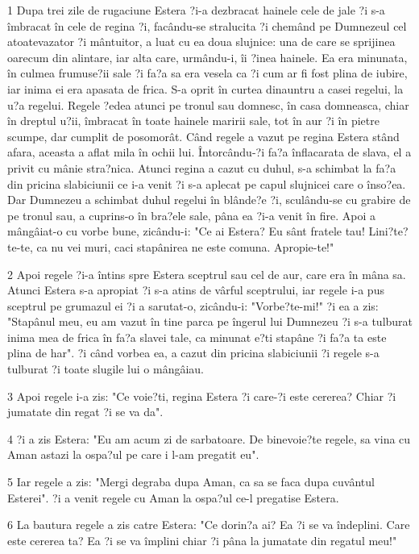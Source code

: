 \par 1 Dupa trei zile de rugaciune Estera ?i-a dezbracat hainele cele de jale ?i s-a îmbracat în cele de regina ?i, facându-se stralucita ?i chemând pe Dumnezeul cel atoatevazator ?i mântuitor, a luat cu ea doua slujnice: una de care se sprijinea oarecum din alintare, iar alta care, urmându-i, îi ?inea hainele. Ea era minunata, în culmea frumuse?ii sale ?i fa?a sa era vesela ca ?i cum ar fi fost plina de iubire, iar inima ei era apasata de frica. S-a oprit în curtea dinauntru a casei regelui, la u?a regelui. Regele ?edea atunci pe tronul sau domnesc, în casa domneasca, chiar în dreptul u?ii, îmbracat în toate hainele maririi sale, tot în aur ?i în pietre scumpe, dar cumplit de posomorât. Când regele a vazut pe regina Estera stând afara, aceasta a aflat mila în ochii lui. Întorcându-?i fa?a înflacarata de slava, el a privit cu mânie stra?nica. Atunci regina a cazut cu duhul, s-a schimbat la fa?a din pricina slabiciunii ce i-a venit ?i s-a aplecat pe capul slujnicei care o înso?ea. Dar Dumnezeu a schimbat duhul regelui în blânde?e ?i, sculându-se cu grabire de pe tronul sau, a cuprins-o în bra?ele sale, pâna ea ?i-a venit în fire. Apoi a mângâiat-o cu vorbe bune, zicându-i: "Ce ai Estera? Eu sânt fratele tau! Lini?te?te-te, ca nu vei muri, caci stapânirea ne este comuna. Apropie-te!"
\par 2 Apoi regele ?i-a întins spre Estera sceptrul sau cel de aur, care era în mâna sa. Atunci Estera s-a apropiat ?i s-a atins de vârful sceptrului, iar regele i-a pus sceptrul pe grumazul ei ?i a sarutat-o, zicându-i: "Vorbe?te-mi!" ?i ea a zis: "Stapânul meu, eu am vazut în tine parca pe îngerul lui Dumnezeu ?i s-a tulburat inima mea de frica în fa?a slavei tale, ca minunat e?ti stapâne ?i fa?a ta este plina de har". ?i când vorbea ea, a cazut din pricina slabiciunii ?i regele s-a tulburat ?i toate slugile lui o mângâiau.
\par 3 Apoi regele i-a zis: "Ce voie?ti, regina Estera ?i care-?i este cererea? Chiar ?i jumatate din regat ?i se va da".
\par 4 ?i a zis Estera: "Eu am acum zi de sarbatoare. De binevoie?te regele, sa vina cu Aman astazi la ospa?ul pe care i l-am pregatit eu".
\par 5 Iar regele a zis: "Mergi degraba dupa Aman, ca sa se faca dupa cuvântul Esterei". ?i a venit regele cu Aman la ospa?ul ce-l pregatise Estera.
\par 6 La bautura regele a zis catre Estera: "Ce dorin?a ai? Ea ?i se va îndeplini. Care este cererea ta? Ea ?i se va împlini chiar ?i pâna la jumatate din regatul meu!"
